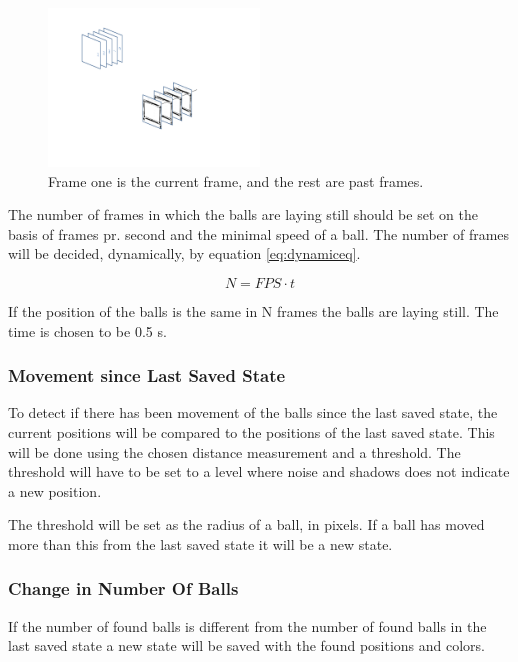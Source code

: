 \begin{figure}[htpb]
\begin{center}
\leavevmode
\includegraphics[width=0.5\textwidth]{images/image_seq_numbers}
\end{center}
\caption{Frame one is the current frame, and the rest are past frames.}
\label{fig:manyframes}
\end{figure}

The number of frames in which the balls are laying still should be set on the basis of frames pr. second and the minimal speed of a ball. The number of frames will be decided, dynamically, by equation \ref{eq:dynamiceq}.

\begin{equation}
N = FPS \cdot t
\label{eq:dynamiceq}
\end{equation}

If the position of the balls is the same in N frames the balls are laying still. The time is chosen to be 0.5 s. 

\subsubsection{Movement since Last Saved State}
To detect if there has been movement of the balls since the last saved state, the current positions will be compared to the positions of the last saved state. This will be done using the chosen distance measurement and a threshold. The threshold will have to be set to a level where noise and shadows does not indicate a new position.

The threshold will be set as the radius of a ball, in pixels. If a ball has moved more than this from the last saved state it will be a new state.

\subsubsection{Change in Number Of Balls}
If the number of found balls is different from the number of found balls in the last saved state a new state will be saved with the found positions and colors.